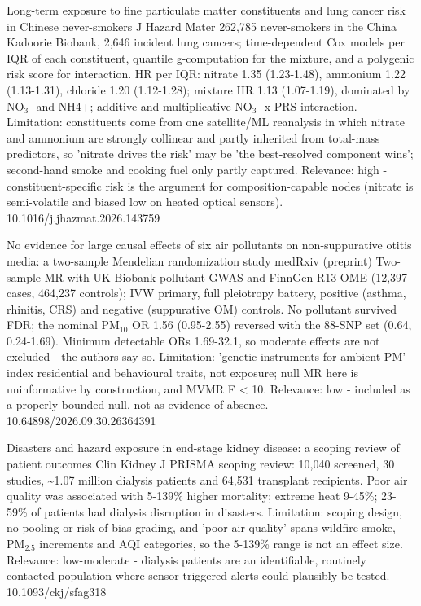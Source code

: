 \documentclass[10pt]{article}
\begin{document}
\par{}\baselineskip{}\baselineskip
{}

{Long-term exposure to fine particulate matter constituents and lung cancer risk in Chinese never-smokers}
{J Hazard Mater}
{262,785 never-smokers in the China Kadoorie Biobank, 2,646 incident lung cancers; time-dependent Cox models per IQR of each constituent, quantile g-computation for the mixture, and a polygenic risk score for interaction. HR per IQR: nitrate 1.35 (1.23-1.48), ammonium 1.22 (1.13-1.31), chloride 1.20 (1.12-1.28); mixture HR 1.13 (1.07-1.19), dominated by NO$_3$- and NH4+; additive and multiplicative NO$_3$- x PRS interaction. Limitation: constituents come from one satellite/ML reanalysis in which nitrate and ammonium are strongly collinear and partly inherited from total-mass predictors, so 'nitrate drives the risk' may be 'the best-resolved component wins'; second-hand smoke and cooking fuel only partly captured. Relevance: high - constituent-specific risk is the argument for composition-capable nodes (nitrate is semi-volatile and biased low on heated optical sensors).}
{10.1016/j.jhazmat.2026.143759}

{No evidence for large causal effects of six air pollutants on non-suppurative otitis media: a two-sample Mendelian randomization study}
{medRxiv (preprint)}
{Two-sample MR with UK Biobank pollutant GWAS and FinnGen R13 OME (12,397 cases, 464,237 controls); IVW primary, full pleiotropy battery, positive (asthma, rhinitis, CRS) and negative (suppurative OM) controls. No pollutant survived FDR; the nominal PM$_{10}$ OR 1.56 (0.95-2.55) reversed with the 88-SNP set (0.64, 0.24-1.69). Minimum detectable ORs 1.69-32.1, so moderate effects are not excluded - the authors say so. Limitation: 'genetic instruments for ambient PM' index residential and behavioural traits, not exposure; null MR here is uninformative by construction, and MVMR F < 10. Relevance: low - included as a properly bounded null, not as evidence of absence.}
{10.64898/2026.09.30.26364391}

{Disasters and hazard exposure in end-stage kidney disease: a scoping review of patient outcomes}
{Clin Kidney J}
{PRISMA scoping review: 10,040 screened, 30 studies, \textasciitilde{}1.07 million dialysis patients and 64,531 transplant recipients. Poor air quality was associated with 5-139\% higher mortality; extreme heat 9-45\%; 23-59\% of patients had dialysis disruption in disasters. Limitation: scoping design, no pooling or risk-of-bias grading, and 'poor air quality' spans wildfire smoke, PM$_{2.5}$ increments and AQI categories, so the 5-139\% range is not an effect size. Relevance: low-moderate - dialysis patients are an identifiable, routinely contacted population where sensor-triggered alerts could plausibly be tested.}
{10.1093/ckj/sfag318}
\end{document}

